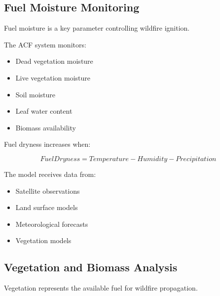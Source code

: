 
\subsection{Fuel Moisture Monitoring}

Fuel moisture is a key parameter controlling wildfire ignition.

The ACF system monitors:

\begin{itemize}

\item Dead vegetation moisture

\item Live vegetation moisture

\item Soil moisture

\item Leaf water content

\item Biomass availability

\end{itemize}


Fuel dryness increases when:

\[
FuelDryness
=
Temperature
-
Humidity
-
Precipitation
\]


The model receives data from:

\begin{itemize}

\item Satellite observations

\item Land surface models

\item Meteorological forecasts

\item Vegetation models

\end{itemize}



\subsection{Vegetation and Biomass Analysis}

Vegetation represents the available fuel for wildfire propagation.

